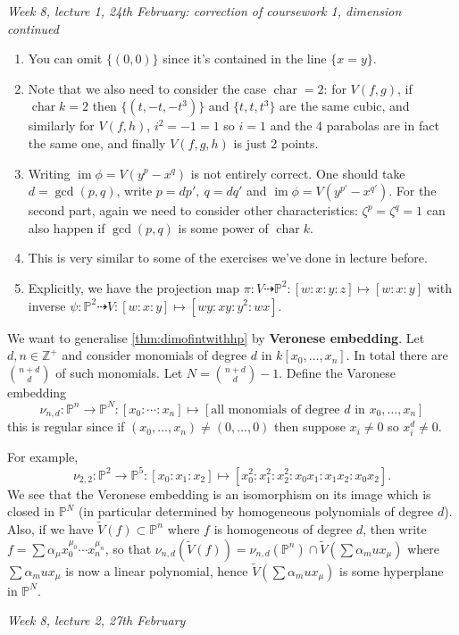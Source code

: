 \documentclass{article}
\newcommand{\Z}{\mathbb{Z}}
\newcommand{\p}{\mathbb{P}}
\newcommand{\im}{\operatorname{im}}
\newcommand{\Char}{\operatorname{char}}
\theoremstyle{definition}
\begin{document}
\begin{flushright}
\textit{Week 8, lecture 1, 24th February: correction of coursework 1, dimension continued}
\end{flushright}

\begin{enumerate}
\item You can omit $\{(0,0)\}$ since it's contained in the line $\{x=y\}$.
\item Note that we also need to consider the case $\Char =2$: for $V(f,g)$, if $\Char k=2$ then $\{(t,-t,-t^3)\}$ and $\{t,t,t^3\}$ are the same cubic, and similarly for $V(f,h)$, $i^2=-1=1$ so $i=1$ and the 4 parabolas are in fact the same one, and finally $V(f,g,h)$ is just 2 points.
\item Writing $\im\phi=V\left(y^p-x^q\right)$ is not entirely correct. One should take $d=\gcd(p,q)$, write $p=dp',\ q=dq'$ and $\im\phi=V\left(y^{p'}-x^{q'}\right)$. For the second part, again we need to consider other characteristics: $\zeta^p=\zeta^q=1$ can also happen if $\gcd(p,q)$ is some power of $\Char k$.
\item This is very similar to some of the exercises we've done in lecture before.
\item Explicitly, we have the projection map $\pi:V\dashrightarrow\p^2:[w:x:y:z]\mapsto[w:x:y]$ with inverse $\psi:\p^2\dashrightarrow V:[w:x:y]\mapsto [wy:xy:y^2:wx]$.
\end{enumerate}

We want to generalise \ref{thm:dimofintwithhp} by \textbf{Veronese embedding}. Let $d,n\in\Z^+$ and consider monomials of degree $d$ in $k[x_0,\ldots,x_n]$. In total there are $\binom{n+d}{d}$ of such monomials. Let $N=\binom{n+d}{d}-1$. Define the Varonese embedding
\[
\nu_{n,d}:\p^n\rightarrow\p^N:[x_0:\cdots:x_n]\mapsto \left[\text{all monomials of degree }d\text{ in }x_0,\ldots,x_n\right]
\]
this is regular since if $(x_0,\ldots,x_n)\neq (0,\ldots,0)$ then suppose $x_i\neq 0$ so $x_i^d\neq 0$.

For example,
\[
\nu_{2,2}:\p^2\rightarrow\p^5:[x_0:x_1:x_2]\mapsto [x_0^2:x_1^2:x_2^2:x_0x_1:x_1x_2:x_0x_2].
\]
We see that the Veronese embedding is an isomorphism on its image which is closed in $\p^N$ (in particular determined by homogeneous polynomials of degree $d$). Also, if we have $\widetilde V(f)\subset \p^n$ where $f$ is homogeneous of degree $d$, then write $f=\sum\alpha_\mu x_0^{\mu_0}\cdots x_n^{\mu_n}$, so that $\nu_{n,d}\left(\widetilde V(f)\right)=\nu_{n,d}(\p^n)\cap \widetilde V\left(\sum\alpha_mu x_\mu\right)$ where $\sum\alpha_mu x_\mu$ is now a linear polynomial, hence $\widetilde V\left(\sum\alpha_mu x_\mu\right)$ is some hyperplane in $\p^N$.
\begin{flushright}
\textit{Week 8, lecture 2, 27th February}
\end{flushright}
\end{document}
